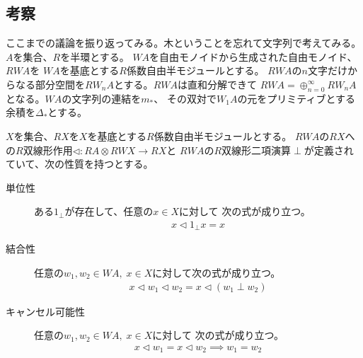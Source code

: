 	\subsection{考察}\label{s2:考察} %
		ここまでの議論を振り返ってみる。木ということを忘れて文字列で考えてみる。
		$A$を集合、$R$を半環とする。
		$WA$を自由モノイドから生成された自由モノイド、$RWA$を
		$WA$を基底とする$R$係数自由半モジュールとする。
		$RWA$の$n$文字だけからなる部分空間を$RW_nA$とする。$RWA$は直和分解できて
		$RWA=\oplus_{n=0}^\infty RW_nA$となる。$WA$の文字列の連結を$m_*$、
		その双対で$W_1A$の元をプリミティブとする余積を$\Delta_*$とする。

		$X$を集合、$RX$を$X$を基底とする$R$係数自由半モジュールとする。
		$RWA$の$RX$への$R$双線形作用$\lhd:RA\otimes RWX\to RX$と
		$RWA$の$R$双線形二項演算$\perp$が定義されていて、次の性質を持つとする。
		\begin{description} %
			\item[単位性]ある$1_\perp$が存在して、任意の$x\in X$に対して
			次の式が成り立つ。
			\begin{equation*}\begin{split} %
				x\lhd 1_\perp x = x 
			\end{split}\end{equation*} %
			\item[結合性]任意の$w_1,w_2\in WA,\; x\in X$に対して次の式が成り立つ。
			\begin{equation*}\begin{split} %
				x\lhd w_1\lhd w_2 = x\lhd (w_1\perp w_2)
			\end{split}\end{equation*} %
			\item[キャンセル可能性]任意の$w_1,w_2\in WA,\; x\in X$に対して
			次の式が成り立つ。
			\begin{equation*}\begin{split} %
				x\lhd w_1 = x\lhd w_2 \implies w_1=w_2
			\end{split}\end{equation*} %
		\end{description} %
		
